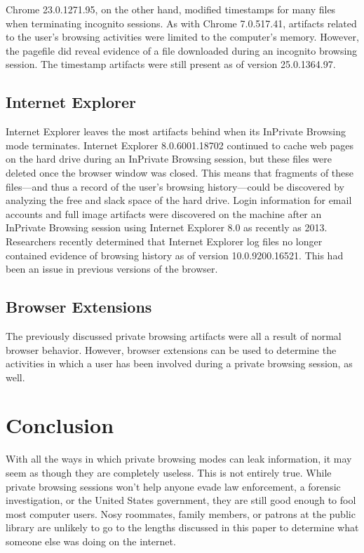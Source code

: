 \documentclass[pdftex,letterpaper,titlepage,12pt]{article}
\begin{document}
    Chrome 23.0.1271.95, on the other hand, modified timestamps for many files
    when terminating incognito sessions. As with Chrome 7.0.517.41, artifacts 
    related to the user's browsing activities were limited to the computer's 
    memory. However, the pagefile did reveal evidence of a file downloaded
    during an incognito browsing session.\cite{ohana13} The timestamp artifacts
    were still present as of version 25.0.1364.97.\cite{satvat13}
    
    \subsection{Internet Explorer}
    Internet Explorer leaves the most artifacts behind when its InPrivate
    Browsing mode terminates.\cite{ohana13} Internet Explorer 8.0.6001.18702
    continued to cache web pages on the hard drive during an InPrivate
    Browsing session, but these files were deleted once the browser window was
    closed. This means that fragments of these files---and thus a record of the
    user's browsing history---could be discovered by analyzing the free and
    slack space of the hard drive.\cite{said11} Login information for email
    accounts and full image artifacts were discovered on the machine after an 
    InPrivate Browsing session using Internet Explorer 8.0 as recently as 2013.
    \cite{ohana13} Researchers recently determined that Internet Explorer log 
    files no longer contained evidence of browsing history as of version 
    10.0.9200.16521. This had been an issue in previous versions of the 
    browser.\cite{satvat13}    

    \subsection{Browser Extensions}
    The previously discussed private browsing artifacts were all a result of
	normal browser behavior. However, browser extensions can be used to
	determine the activities in which a user has been involved during a private
	browsing session, as well. 

  \section{Conclusion}
  With all the ways in which private browsing modes can leak information, it
  may seem as though they are completely useless. This is not entirely true.
  While private browsing sessions won't help anyone evade law enforcement, a
  forensic investigation, or the United States government, they are still good
  enough to fool most computer users. Nosy roommates, family members, or
  patrons at the public library are unlikely to go to the lengths discussed in
  this paper to determine what someone else was doing on the internet.
\end{document}

